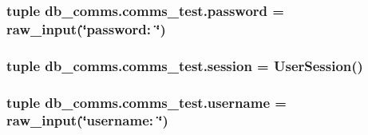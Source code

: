 \subsubsection[{password}]{\setlength{\rightskip}{0pt plus 5cm}tuple db\+\_\+comms.\+comms\+\_\+test.\+password = raw\+\_\+input(\char`\"{}password\+: \char`\"{})}\label{namespacedb__comms_1_1comms__test_a4e858fd6a002a5016e2d93032fdab765}
\hypertarget{namespacedb__comms_1_1comms__test_a164aac5cbf032410febfe516997942ca}{}
\subsubsection[{session}]{\setlength{\rightskip}{0pt plus 5cm}tuple db\+\_\+comms.\+comms\+\_\+test.\+session = {\bf User\+Session}()}\label{namespacedb__comms_1_1comms__test_a164aac5cbf032410febfe516997942ca}
\hypertarget{namespacedb__comms_1_1comms__test_a0a387f4eb9b75c0f3fff8e8dcf0c11e6}{}
\subsubsection[{username}]{\setlength{\rightskip}{0pt plus 5cm}tuple db\+\_\+comms.\+comms\+\_\+test.\+username = raw\+\_\+input(\char`\"{}username\+: \char`\"{})}\label{namespacedb__comms_1_1comms__test_a0a387f4eb9b75c0f3fff8e8dcf0c11e6}

